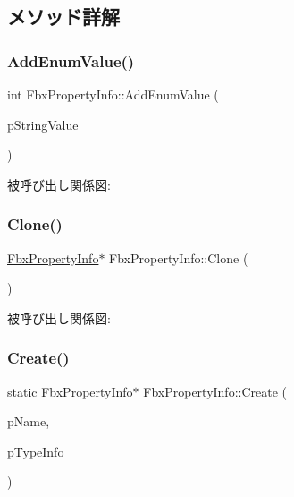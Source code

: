 \subsection{メソッド詳解}
\mbox{\label{class_fbx_property_info_a47286c778cd759d4c1e8d37f7a4ca785}} 
\subsubsection{\texorpdfstring{Add\+Enum\+Value()}{AddEnumValue()}}
{\footnotesize\ttfamily int Fbx\+Property\+Info\+::\+Add\+Enum\+Value (\begin{DoxyParamCaption}\item[{const char $\ast$}]{p\+String\+Value }\end{DoxyParamCaption})}

被呼び出し関係図\+:
\mbox{\label{class_fbx_property_info_a2eacb232583e5bcb8f4abc5f6689b3b7}} 
\subsubsection{\texorpdfstring{Clone()}{Clone()}}
{\footnotesize\ttfamily \hyperlink{class_fbx_property_info}{Fbx\+Property\+Info}$\ast$ Fbx\+Property\+Info\+::\+Clone (\begin{DoxyParamCaption}\item[{\hyperlink{class_fbx_property_page}{Fbx\+Property\+Page} $\ast$}]{ }\end{DoxyParamCaption})}

被呼び出し関係図\+:
\mbox{\label{class_fbx_property_info_a17f842fb2c82eb02053ea4b7e2dacc6f}} 
\subsubsection{\texorpdfstring{Create()}{Create()}\hspace{0.1cm}{\footnotesize\ttfamily [1/2]}}
{\footnotesize\ttfamily static \hyperlink{class_fbx_property_info}{Fbx\+Property\+Info}$\ast$ Fbx\+Property\+Info\+::\+Create (\begin{DoxyParamCaption}\item[{const char $\ast$}]{p\+Name,  }\item[{\hyperlink{class_fbx_property_page}{Fbx\+Property\+Page} $\ast$}]{p\+Type\+Info }\end{DoxyParamCaption})\hspace{0.3cm}{\ttfamily [static]}}

